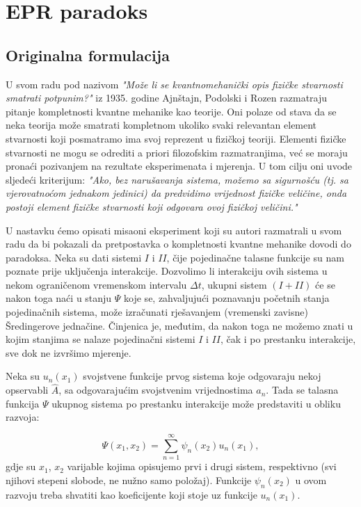 \chapter{EPR paradoks}
\section{Originalna formulacija}
U svom radu pod nazivom {\it{"Može li se kvantnomehanički opis fizičke stvarnosti smatrati potpunim?"}} iz 1935. godine Ajnštajn, Podolski i Rozen razmatraju pitanje kompletnosti kvantne mehanike kao teorije.
Oni polaze od stava da se neka teorija može smatrati kompletnom ukoliko  svaki relevantan element stvarnosti koji posmatramo ima svoj reprezent u fizičkoj teoriji.
Elementi fizičke stvarnosti ne mogu se odrediti a priori filozofskim razmatranjima, već se moraju pronaći pozivanjem na rezultate eksperimenata i mjerenja. U tom cilju oni uvode sljedeći kriterijum: {\it{"Ako, bez narušavanja sistema, možemo sa sigurnošću (tj. sa vjerovatnoćom jednakom jedinici) da predvidimo vrijednost fizičke veličine, onda postoji element fizičke stvarnosti koji odgovara ovoj fizičkoj veličini."}}


U nastavku ćemo opisati misaoni eksperiment koji su autori razmatrali u svom radu da bi pokazali da pretpostavka o kompletnosti kvantne mehanike dovodi do paradoksa.
Neka su dati sistemi $I$ i $II$, čije pojedinačne talasne funkcije su nam poznate prije uklju\v cenja interakcije. Dozvolimo li interakciju ovih sistema u nekom ograničenom vremenskom intervalu $\Delta t$,
ukupni sistem $(I + II)$ će se nakon toga naći u stanju $\Psi$ koje se, zahvaljujući poznavanju početnih stanja pojedinačnih sistema,
može izračunati rješavanjem (vremenski zavisne) Šredingerove jednačine.
Činjenica je, međutim, da nakon toga ne možemo znati u kojim stanjima se nalaze pojedinačni sistemi $I$ i $II$, čak i po prestanku interakcije, sve dok ne izvršimo mjerenje.

Neka su $u_n(x_1)$ svojstvene funkcije prvog sistema koje odgovaraju nekoj opservabli $\hat{A}$, sa odgovarajućim svojstvenim vrijednostima $a_n$.
Tada se talasna funkcija $\Psi$ ukupnog sistema po prestanku interakcije može predstaviti u obliku razvoja:

\begin{equation}
    \Psi(x_1, x_2) = \sum_{n=1}^{\infty} \psi_n(x_2)u_n(x_1), \label{eq:talasna_funkcija_ukupnog_sistema_nakon_interakcije}
\end{equation}
gdje su $x_1$, $x_2$ varijable kojima opisujemo prvi i drugi sistem, respektivno (svi njihovi stepeni slobode, ne nužno samo položaj).
Funkcije $\psi_n(x_2)$ u ovom razvoju treba shvatiti kao koeficijente koji stoje uz funkcije $u_n(x_1)$.

